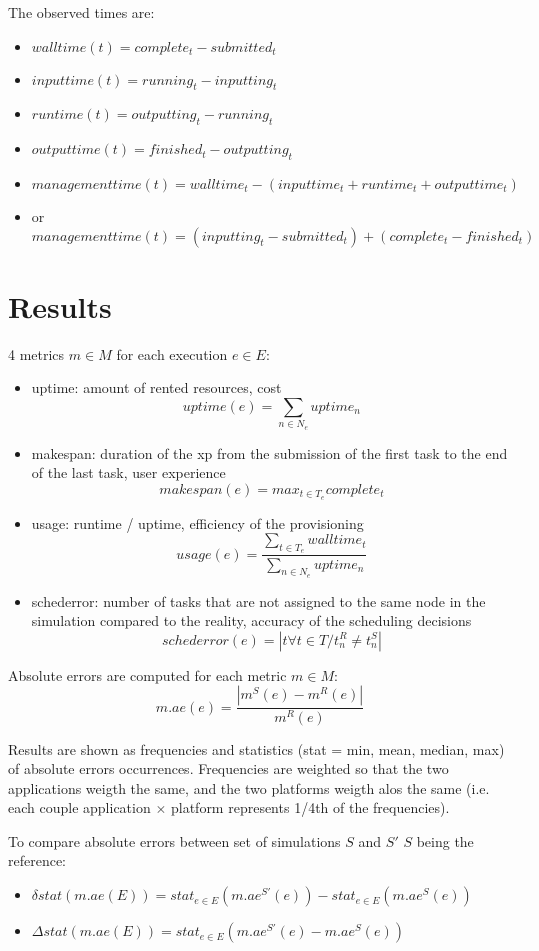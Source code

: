 \documentclass[a4paper,10pt]{article}
\begin{document}
The observed times are:
\begin{itemize}
 \item $walltime(t) = complete_t - submitted_t$ 
 \item $inputtime(t) = running_t - inputting_t$
 \item $runtime(t) = outputting_t - running_t$
 \item $outputtime(t) = finished_t - outputting_t$
 \item $managementtime(t) = walltime_t - (inputtime_t+runtime_t+outputtime_t)$
 \item or $managementtime(t) = (inputting_t - submitted_t) + (complete_t - finished_t)$
\end{itemize}



\section{Results}

4 metrics $m \in M$ for each execution $e \in E$:
\begin{itemize}
 \item uptime: amount of rented resources, cost 
  $$uptime(e) = \sum_{n \in N_e} uptime_n$$
 \item makespan: duration of the xp from the submission of the first task to 
the end of the last task, user experience 
  $$makespan(e) = max_{t \in T_e} complete_t$$
 \item usage: runtime / uptime, efficiency of the provisioning 
  $$usage(e) = \frac{\sum_{t \in T_e} walltime_t}{\sum_{n \in N_e} uptime_n}$$
 \item schederror: number of tasks that are not assigned to the same node in 
the simulation compared to the reality, accuracy of the scheduling decisions
  $$schederror(e) = |t \forall t \in T / t_n^R \neq t_n^S|$$

\end{itemize}

Absolute errors are computed for each metric $m \in M$: 
$$m.ae(e) = \frac{| m^S(e) - m^R(e) |}{m^R(e)}$$

Results are shown as frequencies and statistics (stat = min, mean, median, max) 
of absolute errors occurrences. Frequencies are weighted so that the two applications
weigth the same, and the two platforms weigth alos the same 
(i.e. each couple application $\times$ platform represents 1/4th of the frequencies).

To compare absolute errors between set of simulations $S$ and $S'$
$S$ being the reference:
\begin{itemize}
 \item $\delta stat(m.ae(E)) = stat_{e \in E} ( m.ae^{S'}(e) ) - stat_{e \in E}( m.ae^S(e) )$
 \item $\Delta stat(m.ae(E)) = stat_{e \in E} ( m.ae^{S'}(e) - m.ae^S(e) )$
\end{itemize}
\end{document}
